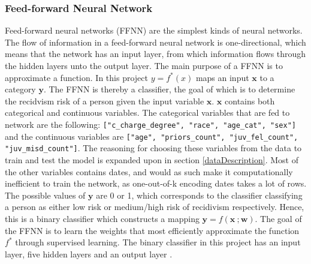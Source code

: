 \documentclass[11pt, fleqn, titlepage]{article}
\begin{document}
	\subsubsection{Feed-forward Neural Network}
	Feed-forward neural networks (FFNN) are the simplest kinds of neural networks. The flow of information in a feed-forward neural network is one-directional, which means that the network has an input layer, from which information flows through the hidden layers unto the output layer. The main purpose of a FFNN is to approximate a function. In this project $ y = f^*(x) $ maps an input $ \mathbf x $ to a category $ \mathbf y $. The FFNN is thereby a classifier, the goal of which is to determine the recidvism risk of a person given the input variable $ \mathbf x $. $ \mathbf x $ contains both categorical and continuous variables. The categorical variables that are fed to network are the following: \texttt{["c\_charge\_degree", "race", "age\_cat", "sex"]} and the continuous variables are \texttt{["age", "priors\_count", "juv\_fel\_count", "juv\_misd\_count"]}. The reasoning for choosing these variables from the data to train and test the model is expanded upon in section \ref{dataDescription}. Most of the other variables contains dates, and would as such make it computationally inefficient to train the network, as one-out-of-k encoding dates takes a lot of rows. The possible values of $ \mathbf y $ are 0 or 1, which corresponds to the classifier classifying a person as either low risk or medium/high risk of recidivism respectively. Hence, this is a binary classifier which constructs a mapping $ \mathbf y = f(\mathbf x \ ; \mathbf w) $. The goal of the FFNN is to learn the weights that most efficiently approximate the function $ f^* $ through supervised learning. The binary classifier in this project has an input layer, five hidden layers and an output layer \cite{dl}.
	
\end{document}
